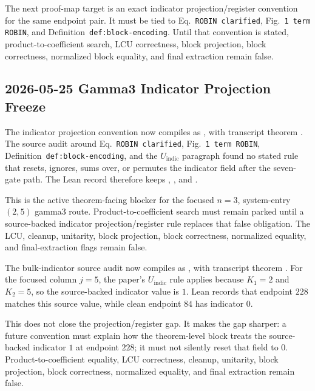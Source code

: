 The next proof-map target is an exact indicator projection/register convention
for the same endpoint pair.  It must be tied to Eq.~\texttt{ROBIN clarified},
Fig.~\texttt{1 term ROBIN}, and Definition~\texttt{def:block-encoding}.  Until
that convention is stated, product-to-coefficient search, LCU correctness,
block projection, block correctness, normalized block equality, and final
extraction remain false.

\subsection{2026-05-25 Gamma3 Indicator Projection Freeze}

The indicator projection convention now compiles as
, with transcript
theorem
.  The
source audit around Eq.~\texttt{ROBIN clarified},
Fig.~\texttt{1 term ROBIN}, Definition~\texttt{def:block-encoding}, and the
\(U_{\mathrm{indic}}\) paragraph found no stated rule that resets, ignores,
sums over, or permutes the indicator field after the seven-gate path.  The
Lean record therefore keeps
,
, and
.

This is the active theorem-facing blocker for the focused \(n=3\),
system-entry \((2,5)\) gamma3 route.  Product-to-coefficient search must remain
parked until a source-backed indicator projection/register rule replaces that
false obligation.  The LCU, cleanup, unitarity, block projection, block
correctness, normalized equality, and final-extraction flags remain false.

The bulk-indicator source audit now compiles as
, with transcript theorem
.  For the
focused column \(j=5\), the paper's \(U_{\mathrm{indic}}\) rule applies
because \(K_1=2\) and \(K_2=5\), so the source-backed indicator value is \(1\).
Lean records that endpoint \(228\) matches this source value, while clean
endpoint \(84\) has indicator \(0\).

This does not close the projection/register gap.  It makes the gap sharper:
a future convention must explain how the theorem-level block treats the
source-backed indicator \(1\) at endpoint \(228\); it must not silently reset
that field to \(0\).  Product-to-coefficient equality, LCU correctness,
cleanup, unitarity, block projection, block correctness, normalized equality,
and final extraction remain false.

